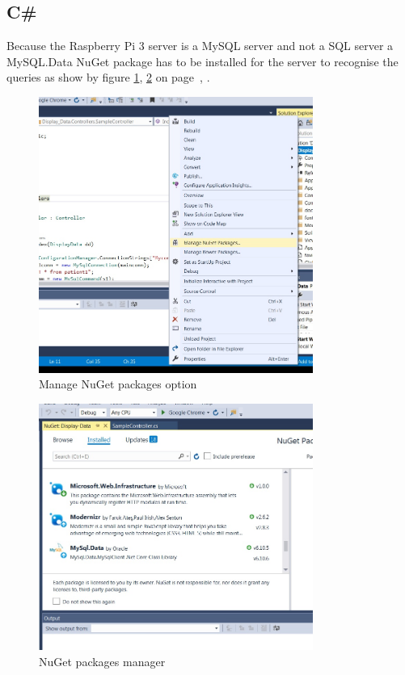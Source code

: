 \documentclass[12pt,]{article}
\numberwithin{figure}{section}
\begin{document}
\subsection{C\#}
Because the Raspberry Pi 3 server is a MySQL server and not a SQL server a MySQL.Data NuGet package has to be installed for the server to recognise the queries as show by figure \ref{fig:20}, \ref{fig:35} on page~\pageref{fig:20}, \pageref{fig:35}.
\begin{figure}[H]
	\begin{center}
		\includegraphics[width=0.8\textwidth]{19}
	\end{center}
    \caption{Manage NuGet packages option}
	\label{fig:20}
\end{figure}
\begin{figure}[H]
	\begin{center}
		\includegraphics[width=0.8\textwidth]{20}
	\end{center}
    \caption{NuGet packages manager}
	\label{fig:35}
\end{figure}
\end{document}
